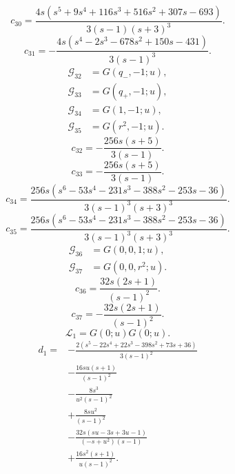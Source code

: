 \begin{equation}
c_{30}=\frac{4 s \left(s^{5} + 9 s^{4} + 116 s^{3} + 516 s^{2} + 307 s - 693\right)}{3 \left(s - 1\right) \left(s + 3\right)^{3}}.
\end{equation}
\begin{equation}
c_{31}=- \frac{4 s \left(s^{4} - 2 s^{3} - 678 s^{2} + 150 s - 431\right)}{3 \left(s - 1\right)^{3}}.
\end{equation}
\begin{align}
\mathcal G_{32}&=G(q_{-},-1;u),\\
\mathcal G_{33}&=G(q_{+},-1;u),\\
\mathcal G_{34}&=G(1,-1;u),\\
\mathcal G_{35}&=G(r^{2},-1;u).
\end{align}
\begin{equation}
c_{32}=- \frac{256 s \left(s + 5\right)}{3 \left(s - 1\right)}.
\end{equation}
\begin{equation}
c_{33}=- \frac{256 s \left(s + 5\right)}{3 \left(s - 1\right)}.
\end{equation}
\begin{equation}
c_{34}=\frac{256 s \left(s^{6} - 53 s^{4} - 231 s^{3} - 388 s^{2} - 253 s - 36\right)}{3 \left(s - 1\right)^{3} \left(s + 3\right)^{3}}.
\end{equation}
\begin{equation}
c_{35}=\frac{256 s \left(s^{6} - 53 s^{4} - 231 s^{3} - 388 s^{2} - 253 s - 36\right)}{3 \left(s - 1\right)^{3} \left(s + 3\right)^{3}}.
\end{equation}
\begin{align}
\mathcal G_{36}&=G(0,0,1;u),\\
\mathcal G_{37}&=G(0,0,r^{2};u).
\end{align}
\begin{equation}
c_{36}=\frac{32 s \left(2 s + 1\right)}{\left(s - 1\right)^{2}}.
\end{equation}
\begin{equation}
c_{37}=- \frac{32 s \left(2 s + 1\right)}{\left(s - 1\right)^{2}}.
\end{equation}
\begin{equation}
\mathcal L_{1}=G(0;u)G(0;u).
\end{equation}
\begin{align}
d_{1}={}&- \frac{2 \left(s^{5} - 22 s^{4} + 22 s^{3} - 398 s^{2} + 73 s + 36\right)}{3 \left(s - 1\right)^{2}}\\
&- \frac{16 s u \left(s + 1\right)}{\left(s - 1\right)^{2}}\\
&- \frac{8 s^{3}}{u^{2} \left(s - 1\right)^{2}}\\
&+\frac{8 s u^{2}}{\left(s - 1\right)^{2}}\\
&- \frac{32 s \left(s u - 3 s + 3 u - 1\right)}{\left(- s + u^{2}\right) \left(s - 1\right)}\\
&+\frac{16 s^{2} \left(s + 1\right)}{u \left(s - 1\right)^{2}}.
\end{align}
